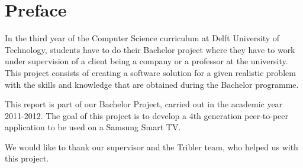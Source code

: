\chapter*{Preface}
In the third year of the Computer Science curriculum at Delft University of Technology, students have to do their Bachelor project where they have to work under supervision of a client being a company or a professor at the university. This project consists of creating a software solution for a given realistic problem with the skills and knowledge that are obtained during the Bachelor programme.

This report is part of our Bachelor Project, carried out in the academic year 2011-2012. The goal of this project is to develop a 4th generation peer-to-peer application to be used on a Samsung Smart TV.

We would like to thank our supervisor and the Tribler team, who helped us with this project.